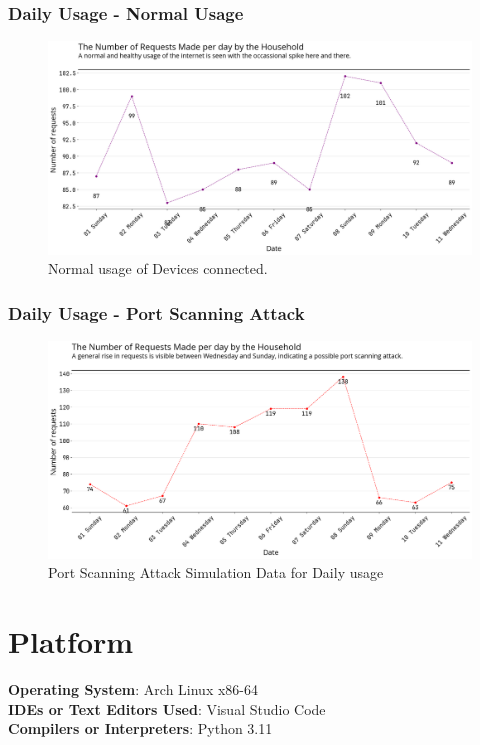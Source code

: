 \documentclass[11pt]{article}
\begin{document}
\subsubsection{Daily Usage - Normal Usage}
\begin{figure}[H]
    \centering
    \includegraphics[width=.95\textwidth]{router_log_analysis_graphs/normal_requests_per_day.png}
    \caption{Normal usage of Devices connected. }
\end{figure}


\subsubsection{Daily Usage - Port Scanning Attack}
\begin{figure}[H]
    \centering
    \includegraphics[width=.95\textwidth]{router_log_analysis_graphs/port_scanning_daily_usage.png}
    \caption{Port Scanning Attack Simulation Data for Daily usage}
\end{figure}


\section{Platform}
\textbf{Operating System}: Arch Linux x86-64 \\
\textbf{IDEs or Text Editors Used}: Visual Studio Code\\
\textbf{Compilers or Interpreters}: Python 3.11\\
\end{document}
